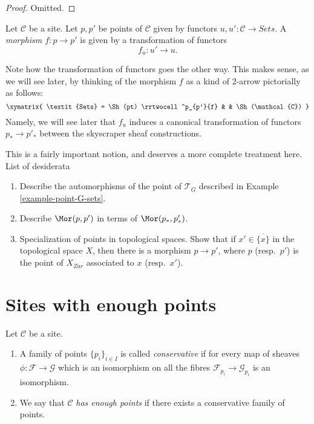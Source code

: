 \begin{proof}
Omitted.
\end{proof}

\begin{definition}
\label{definition-morphism-points}
Let $\mathcal{C}$ be a site. Let $p, p'$ be points of $\mathcal{C}$
given by functors $u, u' : \mathcal{C} \to \textit{Sets}$.
A {\it morphism $f : p \to p'$} is given by a transformation of
functors
$$
f_u : u' \to u.
$$
\end{definition}

\noindent
Note how the transformation of functors goes the other way.
This makes sense, as we will see later, by thinking of
the morphism $f$ as a kind of $2$-arrow pictorially as
follows:
$$
\xymatrix{
\textit{Sets}
=
\Sh(pt)
\rrtwocell^p_{p'}{f}
&
&
\Sh(\mathcal{C})
}
$$
Namely, we will see later that $f_u$ induces a canonical
transformation of functors $p_* \to p'_*$ between
the skyscraper sheaf constructions.

\medskip\noindent
This is a fairly important notion, and deserves a more complete
treatment here. List of desiderata
\begin{enumerate}
\item Describe the automorphisms of the point of $\mathcal{T}_G$
described in Example \ref{example-point-G-sets}.
\item Describe $\Mor(p, p')$ in terms of  $\Mor(p_*, p'_*)$.
\item Specialization of points in topological spaces.
Show that if $x' \in \overline{\{x\}}$ in the topological space
$X$, then there is a morphism $p \to p'$, where $p$ (resp.\ $p'$)
is the point of $X_{Zar}$ associated to $x$ (resp.\ $x'$).
\end{enumerate}




\section{Sites with enough points}
\label{section-sites-enough-points}

\begin{definition}
\label{definition-enough-points}
Let $\mathcal{C}$ be a site.
\begin{enumerate}
\item A family of points $\{p_i\}_{i\in I}$ is called {\it conservative}
if for every map of sheaves $\phi : \mathcal{F} \to \mathcal{G}$
which is an isomorphism on all the fibres $\mathcal{F}_{p_i}
\to \mathcal{G}_{p_i}$ is an isomorphism.
\item  We say that $\mathcal{C}$ {\it has enough points}
if there exists a conservative family of points.
\end{enumerate}
\end{definition}

